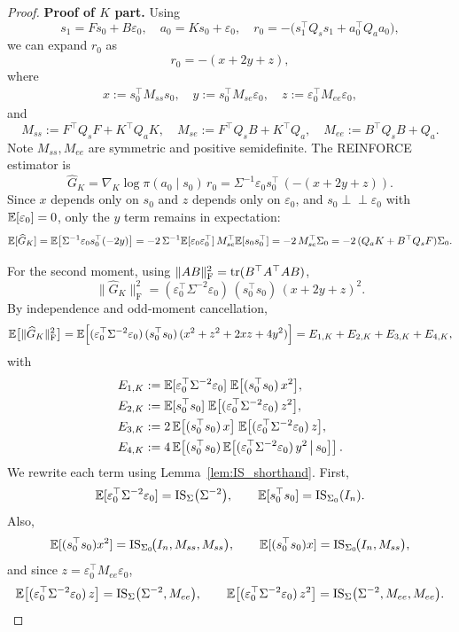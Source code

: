\begin{proof}
\textbf{Proof of $K$ part.}
Using
\[
s_1 = F s_0 + B\varepsilon_0,\quad
a_0 = K s_0 + \varepsilon_0,\quad
r_0 =-\big(s_1^\top Q_s s_1+a_0^\top Q_a a_0\big),
\]
we can expand $r_0$ as
\[
r_0 = -(x + 2y + z),
\]
where
\begin{align}\label{eq:lqr-decompose-r0}
x := s_0^\top M_{ss} s_0,\quad
y := s_0^\top M_{se}\varepsilon_0,\quad
z := \varepsilon_0^\top M_{ee}\varepsilon_0,
\end{align}
and
\[
M_{ss}:=F^\top Q_sF+K^\top Q_a K,\quad
M_{se}:=F^\top Q_sB+K^\top Q_a,\quad
M_{ee}:=B^\top Q_s B+Q_a.
\]
Note $M_{ss}, M_{ee}$ are symmetric and positive semidefinite. The REINFORCE estimator is
\[
\widehat G_K = \nabla_K\log\pi(a_0\mid s_0)\,r_0
= \Sigma^{-1}\varepsilon_0 s_0^\top\, (-(x+2y+z)).
\]
Since $x$ depends only on $s_0$ and $z$ depends only on $\varepsilon_0$, and $s_0\perp\!\!\!\perp \varepsilon_0$ with
${\mathbb{E}}[\varepsilon_0]=0$, only the $y$ term remains in expectation:
\[
{\mathbb{E}}[\widehat G_K]
=
{\mathbb{E}}\!\left[\Sigma^{-1}\varepsilon_0 s_0^\top (-2y)\right]
= -2\,\Sigma^{-1}{\mathbb{E}}[\varepsilon_0\varepsilon_0^\top]\,M_{se}^\top {\mathbb{E}}[s_0 s_0^\top]
= -2\,M_{se}^\top \Sigma_0
= -2\,(Q_aK+B^\top Q_sF)\Sigma_0.
\]

For the second moment, using $\|AB\|_{\mathrm{F}}^2=\operatorname{tr}(B^\top A^\top A B)$,
\[
\|\widehat G_K\|_{\mathrm{F}}^2
= (\varepsilon_0^\top \Sigma^{-2} \varepsilon_0)\,(s_0^\top s_0)\,(x+2y+z)^2.
\]
By independence and odd-moment cancellation,
\[
{\mathbb{E}}\big[\|\widehat G_K\|_{\mathrm{F}}^2\big]
=
{\mathbb{E}}\Big[(\varepsilon_0^\top \Sigma^{-2} \varepsilon_0)\,(s_0^\top s_0)\,(x^2 + z^2 + 2xz + 4y^2)\Big]
=
E_{1,K}+E_{2,K}+E_{3,K}+E_{4,K},
\]
with
\begin{align*}
E_{1,K} &:= {\mathbb{E}}[\varepsilon_0^\top \Sigma^{-2} \varepsilon_0]\;{\mathbb{E}}\big[(s_0^\top s_0)\,x^2\big],\\
E_{2,K} &:= {\mathbb{E}}[s_0^\top s_0]\;{\mathbb{E}}\big[(\varepsilon_0^\top \Sigma^{-2} \varepsilon_0)\,z^2\big],\\
E_{3,K} &:= 2\,{\mathbb{E}}\big[(s_0^\top s_0)\,x\big]\;{\mathbb{E}}\big[(\varepsilon_0^\top \Sigma^{-2} \varepsilon_0)\,z\big],\\
E_{4,K} &:= 4\,{\mathbb{E}}\!\left[(s_0^\top s_0)\,{\mathbb{E}}\!\left[(\varepsilon_0^\top \Sigma^{-2} \varepsilon_0)\,y^2\,\middle|\,s_0\right]\right].
\end{align*}
We rewrite each term using Lemma~\ref{lem:IS_shorthand}. First,
\[
{\mathbb{E}}[\varepsilon_0^\top \Sigma^{-2}\varepsilon_0]
=\mathrm{IS}_{\Sigma}\big(\Sigma^{-2}\big),
\qquad
{\mathbb{E}}[s_0^\top s_0]=\mathrm{IS}_{\Sigma_0}(I_n).
\]
Also,
\[
{\mathbb{E}}[(s_0^\top s_0)x^2]
=
\mathrm{IS}_{\Sigma_0}\!\big(I_n,M_{ss},M_{ss}\big),
\qquad
{\mathbb{E}}[(s_0^\top s_0)x]
=
\mathrm{IS}_{\Sigma_0}\!\big(I_n,M_{ss}\big),
\]
and since $z=\varepsilon_0^\top M_{ee}\varepsilon_0$,
\[
{\mathbb{E}}\big[(\varepsilon_0^\top \Sigma^{-2}\varepsilon_0)\,z\big]
=
\mathrm{IS}_{\Sigma}\big(\Sigma^{-2},M_{ee}\big),
\qquad
{\mathbb{E}}\big[(\varepsilon_0^\top \Sigma^{-2}\varepsilon_0)\,z^2\big]
=
\mathrm{IS}_{\Sigma}\big(\Sigma^{-2},M_{ee},M_{ee}\big).
\]


\end{proof}
